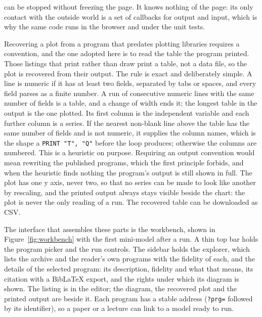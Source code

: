 can be stopped without freezing the page. It knows nothing of the page: its only contact with the outside world is a set of callbacks for output and input, which is why the same code runs in the browser and under the unit tests.

Recovering a plot from a program that predates plotting libraries requires a convention, and the one adopted here is to read the table the program printed. Those listings that print rather than draw print a table, not a data file, so the plot is recovered from their output. The rule is exact and deliberately simple. A line is numeric if it has at least two fields, separated by tabs or spaces, and every field parses as a finite number. A run of consecutive numeric lines with the same number of fields is a table, and a change of width ends it; the longest table in the output is the one plotted. Its first column is the independent variable and each further column is a series. If the nearest non-blank line above the table has the same number of fields and is not numeric, it supplies the column names, which is the shape a \texttt{PRINT "T", "Q"} before the loop produces; otherwise the columns are numbered. This is a heuristic on purpose. Requiring an output convention would mean rewriting the published programs, which the first principle forbids, and when the heuristic finds nothing the program's output is still shown in full. The plot has one y axis, never two, so that no series can be made to look like another by rescaling, and the printed output always stays visible beside the chart: the plot is never the only reading of a run. The recovered table can be downloaded as CSV.

The interface that assembles these parts is the workbench, shown in Figure~\ref{fig:workbench} with the first mini-model after a run. A thin top bar holds the program picker and the run controls. The sidebar holds the explorer, which lists the archive and the reader's own programs with the fidelity of each, and the details of the selected program: its description, fidelity and what that means, its citation with a BibLaTeX export, and the rights under which its diagram is shown. The listing is in the editor; the diagram, the recovered plot and the printed output are beside it. Each program has a stable address (\texttt{?prg=} followed by its identifier), so a paper or a lecture can link to a model ready to run.

